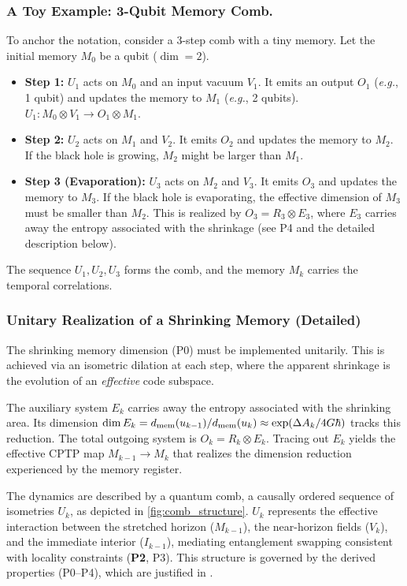\documentclass[aps,prd,preprint,onecolumn,superscriptaddress,nofootinbib,longbibliography,floatfix,11pt,showpacs,showkeys]{revtex4-2}
\newcommand{\Ptwo}{\textbf{P2}\xspace}
\newcommand{\eg}{\textit{e.g.}\xspace}
\theoremstyle{plain}
\theoremstyle{definition}
\theoremstyle{remark}
\begin{document}
\subsubsection{A Toy Example: 3-Qubit Memory Comb.}
To anchor the notation, consider a 3-step comb with a tiny memory. Let the initial memory $M_0$ be a qubit ($\dim=2$).
\begin{itemize}
    \item \textbf{Step 1:} $U_1$ acts on $M_0$ and an input vacuum $V_1$. It emits an output $O_1$ (\eg, 1 qubit) and updates the memory to $M_1$ (\eg, 2 qubits). $U_1: M_0 \otimes V_1 \to O_1 \otimes M_1$.
    \item \textbf{Step 2:} $U_2$ acts on $M_1$ and $V_2$. It emits $O_2$ and updates the memory to $M_2$. If the black hole is growing, $M_2$ might be larger than $M_1$.
    \item \textbf{Step 3 (Evaporation):} $U_3$ acts on $M_2$ and $V_3$. It emits $O_3$ and updates the memory to $M_3$. If the black hole is evaporating, the effective dimension of $M_3$ must be smaller than $M_2$. This is realized by $O_3 = R_3 \otimes E_3$, where $E_3$ carries away the entropy associated with the shrinkage (see P4 and the detailed description below).
\end{itemize}
The sequence $U_1, U_2, U_3$ forms the comb, and the memory $M_k$ carries the temporal correlations.

\subsubsection{Unitary Realization of a Shrinking Memory (Detailed)}
The shrinking memory dimension (P0) must be implemented unitarily. This is achieved via an isometric dilation at each step, where the apparent shrinkage is the evolution of an \emph{effective} code subspace.

The auxiliary system $E_k$ carries away the entropy associated with the shrinking area. Its dimension $\dim E_k = d_{\rm mem}(u_{k-1}) / d_{\rm mem}(u_k) \approx \exp(\Delta A_k / 4G\hbar)$ tracks this reduction. The total outgoing system is $O_k = R_k \otimes E_k$. Tracing out $E_k$ yields the effective CPTP map $M_{k-1}\!\to\!M_k$ that realizes the dimension reduction experienced by the memory register.

The dynamics are described by a quantum comb, a causally ordered sequence of isometries $U_k$, as depicted in \cref{fig:comb_structure}. $U_k$ represents the effective interaction between the stretched horizon ($M_{k-1}$), the near-horizon fields ($V_k$), and the immediate interior ($I_{k-1}$), mediating entanglement swapping consistent with locality constraints (\Ptwo, P3). This structure is governed by the derived properties (P0--P4), which are justified in .
\end{document}
